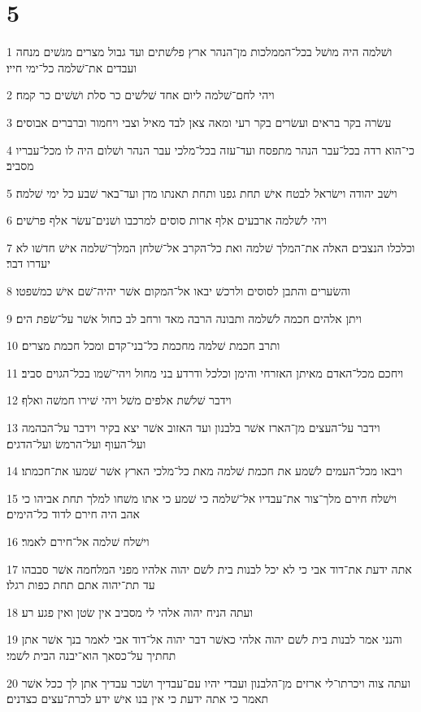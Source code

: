 \chapter{5}

\par 1 ושׁלמה היה מושׁל בכל־הממלכות מן־הנהר ארץ פלשׁתים ועד גבול מצרים מגשׁים מנחה ועבדים את־שׁלמה כל־ימי חייו׃
\par 2 ויהי לחם־שׁלמה ליום אחד שׁלשׁים כר סלת ושׁשׁים כר קמח׃
\par 3 עשׂרה בקר בראים ועשׂרים בקר רעי ומאה צאן לבד מאיל וצבי ויחמור וברברים אבוסים׃
\par 4 כי־הוא רדה בכל־עבר הנהר מתפסח ועד־עזה בכל־מלכי עבר הנהר ושׁלום היה לו מכל־עבריו מסביב׃
\par 5 וישׁב יהודה וישׂראל לבטח אישׁ תחת גפנו ותחת תאנתו מדן ועד־באר שׁבע כל ימי שׁלמה׃
\par 6 ויהי לשׁלמה ארבעים אלף ארות סוסים למרכבו ושׁנים־עשׂר אלף פרשׁים׃
\par 7 וכלכלו הנצבים האלה את־המלך שׁלמה ואת כל־הקרב אל־שׁלחן המלך־שׁלמה אישׁ חדשׁו לא יעדרו דבר׃
\par 8 והשׂערים והתבן לסוסים ולרכשׁ יבאו אל־המקום אשׁר יהיה־שׁם אישׁ כמשׁפטו׃
\par 9 ויתן אלהים חכמה לשׁלמה ותבונה הרבה מאד ורחב לב כחול אשׁר על־שׂפת הים׃
\par 10 ותרב חכמת שׁלמה מחכמת כל־בני־קדם ומכל חכמת מצרים׃
\par 11 ויחכם מכל־האדם מאיתן האזרחי והימן וכלכל ודרדע בני מחול ויהי־שׁמו בכל־הגוים סביב׃
\par 12 וידבר שׁלשׁת אלפים משׁל ויהי שׁירו חמשׁה ואלף׃
\par 13 וידבר על־העצים מן־הארז אשׁר בלבנון ועד האזוב אשׁר יצא בקיר וידבר על־הבהמה ועל־העוף ועל־הרמשׂ ועל־הדגים׃
\par 14 ויבאו מכל־העמים לשׁמע את חכמת שׁלמה מאת כל־מלכי הארץ אשׁר שׁמעו את־חכמתו׃
\par 15 וישׁלח חירם מלך־צור את־עבדיו אל־שׁלמה כי שׁמע כי אתו משׁחו למלך תחת אביהו כי אהב היה חירם לדוד כל־הימים׃
\par 16 וישׁלח שׁלמה אל־חירם לאמר׃
\par 17 אתה ידעת את־דוד אבי כי לא יכל לבנות בית לשׁם יהוה אלהיו מפני המלחמה אשׁר סבבהו עד תת־יהוה אתם תחת כפות רגלו׃
\par 18 ועתה הניח יהוה אלהי לי מסביב אין שׂטן ואין פגע רע׃
\par 19 והנני אמר לבנות בית לשׁם יהוה אלהי כאשׁר דבר יהוה אל־דוד אבי לאמר בנך אשׁר אתן תחתיך על־כסאך הוא־יבנה הבית לשׁמי׃
\par 20 ועתה צוה ויכרתו־לי ארזים מן־הלבנון ועבדי יהיו עם־עבדיך ושׂכר עבדיך אתן לך ככל אשׁר תאמר כי אתה ידעת כי אין בנו אישׁ ידע לכרת־עצים כצדנים׃
